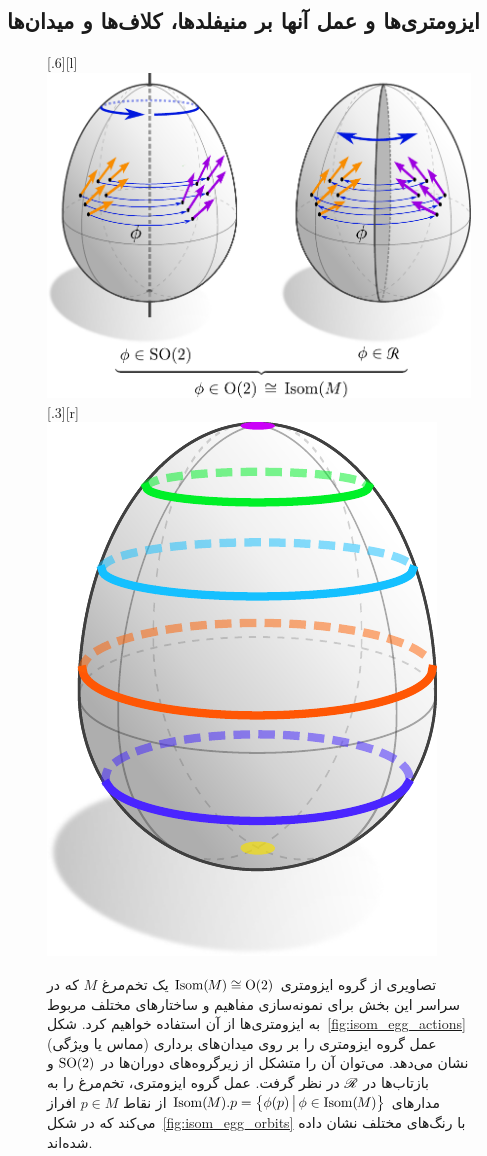 

\subsection{ایزومتری‌ها و عمل آنها بر منیفلدها، کلاف‌ها و میدان‌ها}
\label{sec:isom_background}


\begin{figure}
    \centering
        [.6\linewidth][l]{
            \includegraphics[width=.575\textwidth]{figures/isometry_egg_action.pdf}
        }
    \hfill
        [.3\linewidth][r]{
            \includegraphics[width=.26\textwidth]{figures/isometry_egg_orbits.pdf}
            \hspace*{2ex}
            \vspace*{7.0ex}
        }
    \caption{\small
        تصاویری از گروه ایزومتری $\operatorname{Isom}(\mkern-1.5mu M \mkern-.5mu) \cong \operatorname{O}(2)$ یک تخم‌مرغ $M$ که در سراسر این بخش برای نمونه‌سازی مفاهیم و ساختارهای مختلف مربوط به ایزومتری‌ها از آن استفاده خواهیم کرد.
        شکل~\ref{fig:isom_egg_actions} عمل گروه ایزومتری را بر روی میدان‌های برداری (مماس یا ویژگی) نشان می‌دهد.
        می‌توان آن را متشکل از زیرگروه‌های دوران‌ها در $\operatorname{SO}(2)$ و بازتاب‌ها در $\mathscr{R}$ در نظر گرفت.
        عمل گروه ایزومتری، تخم‌مرغ را به مدارهای $\operatorname{Isom}(\mkern-1.5mu M \mkern-.5mu).p = \big\{\phi(p) \,\big|\, \phi\in\operatorname{Isom}(\mkern-1.5mu M \mkern-.5mu)\big\}$ از نقاط $p\in M$ افراز می‌کند که در شکل~\ref{fig:isom_egg_orbits} با رنگ‌های مختلف نشان داده شده‌اند.
}
\end{figure}
